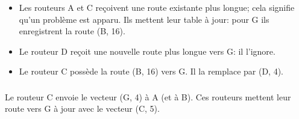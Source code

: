 \documentclass[svgnames,11pt]{beamer}
\begin{document}
\begin{frame}
    \frametitle{}

    \begin{itemize}
        \item Les routeurs A et C reçoivent une route existante plus longue; cela signifie qu'un problème est apparu. Ils mettent leur table à jour: pour G ils enregistrent la route (B, 16).
        \item Le routeur D reçoit une nouvelle route plus longue vers G: il l'ignore.
        \item Le routeur C possède la route (B, 16) vers G. Il la remplace par (D, 4).
    \end{itemize}

\end{frame}
\begin{frame}
    \frametitle{}

    Le routeur C envoie le vecteur (G, 4) à A (et à B). Ces routeurs mettent leur route vers G à jour avec le vecteur (C, 5).

\end{frame}
\end{document}
